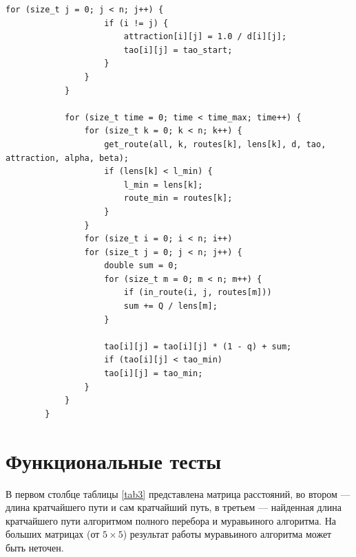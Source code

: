 \documentclass[12pt]{report}
\begin{document}
			\newpage
			\begin{lstlisting}[label={lst:conv2},caption=Реализация муравьиного алгоритма(часть 3)]
				for (size_t j = 0; j < n; j++) {
					if (i != j) {
						attraction[i][j] = 1.0 / d[i][j];
						tao[i][j] = tao_start;
					}
				}
			}
			
			for (size_t time = 0; time < time_max; time++) {
				for (size_t k = 0; k < n; k++) {
					get_route(all, k, routes[k], lens[k], d, tao, attraction, alpha, beta);
					if (lens[k] < l_min) {
						l_min = lens[k];
						route_min = routes[k];
					}
				}
				for (size_t i = 0; i < n; i++)
				for (size_t j = 0; j < n; j++) {
					double sum = 0;
					for (size_t m = 0; m < n; m++) {
						if (in_route(i, j, routes[m]))
						sum += Q / lens[m];
					}
					
					tao[i][j] = tao[i][j] * (1 - q) + sum;
					if (tao[i][j] < tao_min)
					tao[i][j] = tao_min;
				}
			}
		}
	\end{lstlisting}
	
	\section{Функциональные тесты}
	
	В первом столбце таблицы \ref{tab3} представлена матрица расстояний, во втором --- длина кратчайшего пути и сам кратчайший путь, в третьем --- найденная длина кратчайшего пути алгоритмом полного перебора и муравьиного алгоритма. На больших матрицах (от $5\times5$) результат работы муравьиного алгоритма может быть неточен. 
	
\end{document}
